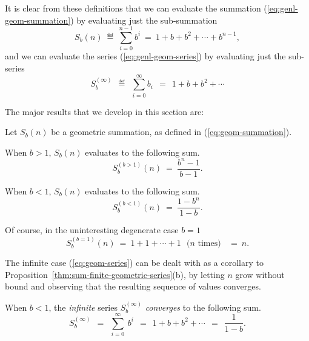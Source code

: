 It is clear from these definitions that we can evaluate the summation
(\ref{eq:genl-geom-summation}) by evaluating just the sub-summation
\begin{equation}
\label{eq:geom-summation}
S_{b}(n) \ \eqdef \ \sum_{i=0}^{n-1} b^i \ = \
1+ b + b^2 + \cdots + b^{n-1},
\end{equation}
and we can evaluate the series (\ref{eq:genl-geom-series}) by
evaluating just the sub-series
\begin{equation}
\label{eq:geom-series}
S_{b}^{(\infty)} \ \ \eqdef \ \ \sum_{i=0}^\infty b_i \ \ = \ \
1+ b + b^2 + \cdots 
\end{equation}

\medskip

The major results that we develop in this section are:

\begin{prop}
\label{thm:sum-finite-geometric-series}
Let $S_{b}(n)$ be a geometric summation, as defined in
(\ref{eq:geom-summation}).

When $b > 1$, $S_{b}(n)$ evaluates to the following sum.
\begin{equation}
\label{eq:geom-sum:b>1}
S^{(b>1)}_{b}(n) \ = \ \frac{b^{n}- 1}{b - 1}.
\end{equation}

When $b < 1$, $S_{b}(n)$ evaluates to the following sum.
\begin{equation}
\label{eq:geom-sum:b<1}
S^{(b<1)}_{b}(n) \ = \ \frac{1 - b^n}{1-b}.
\end{equation}
\end{prop}

Of course, in the uninteresting degenerate case $b=1$
\[ S^{(b=1)}_{b}(n) \ = \ 1 + 1 + \cdots + 1 \ \ \ \mbox{($n$ times)}
  \ \ \ \ = \ n.  \]

\medskip

The infinite case (\ref{eq:geom-series}) can be dealt with as a
corollary to Proposition~\ref{thm:sum-finite-geometric-series}(b), by
letting $n$ grow without bound and observing that the resulting
sequence of values converges.

\begin{prop}
\label{thm:sum-infinite-geometric-series}
When $b < 1$,  the {\em infinite} series $S^{(\infty)}_{b}$ {\em
  converges} to the following sum.
\[ S^{(\infty)}_{b} \ \ = \ \
\sum_{i=0}^\infty \ b^i \ \ = \ \ 1 + b + b^2 + \cdots
 \ \ = \ \ \frac{1}{1-b}.
\]
\end{prop}

